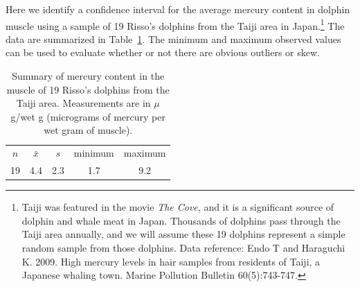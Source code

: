 Here we identify a confidence interval for the average mercury content in dolphin muscle using a sample of 19 Risso's dolphins from the Taiji area in Japan.\footnote{Taiji was featured in the movie \emph{The Cove}, and it is a significant source of dolphin and whale meat in Japan. Thousands of dolphins pass through the Taiji area annually, and we will assume these 19 dolphins represent a simple random sample from those dolphins. Data reference: Endo T and Haraguchi K. 2009. High mercury levels in hair samples from residents of Taiji, a Japanese whaling town. Marine Pollution Bulletin 60(5):743-747.} The data are summarized in Table~\ref{summaryStatsOfHgInMuscleOfRissosDolphins}. The minimum and maximum observed values can be used to evaluate whether or not there are obvious outliers or skew.

\begin{table}[H]
\centering
\begin{tabular}{ccc cc}
\hline
$n$ & $\bar{x}$ & $s$ & minimum & maximum \\
19   & 4.4	  & 2.3  & 1.7	       & 9.2 \\
\hline
\end{tabular}
\caption{Summary of mercury content in the muscle of 19 Risso's dolphins from the Taiji area. Measurements are in $\mu$g/wet g (micrograms of mercury per wet gram of muscle).}
\label{summaryStatsOfHgInMuscleOfRissosDolphins}
\end{table}


%

